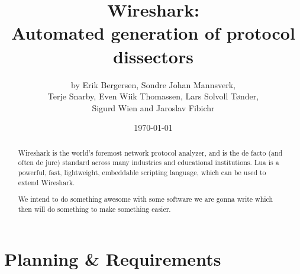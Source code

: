 \documentclass[a4paper, 11pt]{report}
\title{Wireshark:\\ Automated generation of protocol dissectors}
\author{by Erik Bergersen, Sondre Johan Mannsverk,\\ Terje Snarby,
		Even Wiik Thomassen, Lars Solvoll Tønder,\\ Sigurd Wien
		and Jaroslav Fibichr}
\date{\today}
\begin{document}
\maketitle

\begin{abstract}
Wireshark is the world's foremost network protocol analyzer, and is the de
facto (and often de jure) standard across many industries and educational
institutions. Lua is a powerful, fast, lightweight, embeddable scripting
language, which can be used to extend Wireshark.

We intend to do something awesome with some software we are gonna write
which then will do something to make something easier.
\end{abstract}

\tableofcontents

\part{Planning \& Requirements}


\end{document}
